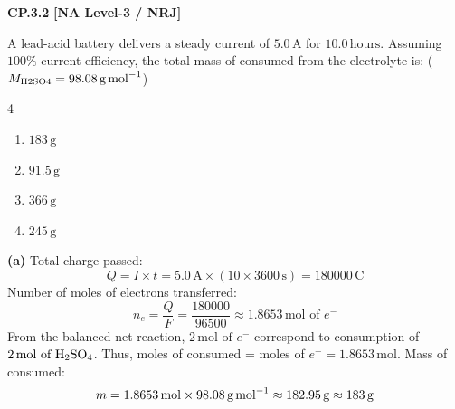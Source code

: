 \begin{problembox}
\textbf{CP.3.2} \hfill \textbf{[NA Level-3 / NRJ]}

A lead-acid battery delivers a steady current of $5.0\,\text{A}$ for $10.0\,\text{hours}$. Assuming $100\%$ current efficiency, the total mass of  consumed from the electrolyte is: ($M_{\text{H2SO4}} = 98.08\,\text{g\,mol}^{-1}$)
\begin{multicols}{4}
\begin{enumerate}[label=(\alph*)]
    \item $183\,\text{g}$
    \item $91.5\,\text{g}$
    \item $366\,\text{g}$
    \item $245\,\text{g}$
\end{enumerate}
\end{multicols}
\end{problembox}
\begin{solution}
\textbf{(a)}
Total charge passed:
\begin{equation*}
    Q = I \times t = 5.0\,\text{A} \times (10 \times 3600\,\text{s}) = 180000\,\text{C}
\end{equation*}
Number of moles of electrons transferred:
\begin{equation*}
    n_e = \frac{Q}{F} = \frac{180000}{96500} \approx 1.8653\,\text{mol of } e^-
\end{equation*}
From the balanced net reaction, $2\,\text{mol of } e^-$ correspond to consumption of $2\,\text{mol of } \ce{H2SO4}$.
Thus, moles of  consumed = moles of $e^- = 1.8653\,\text{mol}$.
Mass of  consumed:
\begin{equation*}
    m = 1.8653\,\text{mol} \times 98.08\,\text{g\,mol}^{-1} \approx 182.95\,\text{g} \approx 183\,\text{g}
\end{equation*}
\end{solution}

